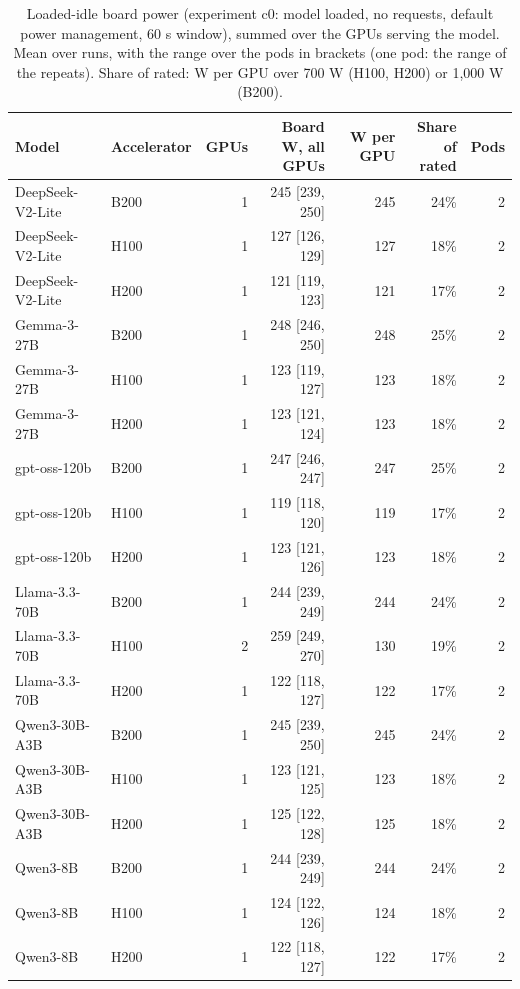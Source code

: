 \begin{table}[t]
\centering
\footnotesize
\setlength{\tabcolsep}{4pt}
\caption{Loaded-idle board power (experiment c0: model loaded, no requests, default power management, 60 s window), summed over the GPUs serving the model. Mean over runs, with the range over the pods in brackets (one pod: the range of the repeats). Share of rated: W per GPU over 700 W (H100, H200) or 1,000 W (B200).}\label{tab:idle}
\begin{tabular}{llrrrrr}
\toprule
Model & Accelerator & GPUs & \makecell[r]{Board W, all\\GPUs} & W per GPU & \makecell[r]{Share of\\rated} & Pods \\
\midrule
DeepSeek-V2-Lite & B200 & 1 & 245 {[}239, 250{]} & 245 & 24\% & 2 \\
DeepSeek-V2-Lite & H100 & 1 & 127 {[}126, 129{]} & 127 & 18\% & 2 \\
DeepSeek-V2-Lite & H200 & 1 & 121 {[}119, 123{]} & 121 & 17\% & 2 \\
Gemma-3-27B & B200 & 1 & 248 {[}246, 250{]} & 248 & 25\% & 2 \\
Gemma-3-27B & H100 & 1 & 123 {[}119, 127{]} & 123 & 18\% & 2 \\
Gemma-3-27B & H200 & 1 & 123 {[}121, 124{]} & 123 & 18\% & 2 \\
gpt-oss-120b & B200 & 1 & 247 {[}246, 247{]} & 247 & 25\% & 2 \\
gpt-oss-120b & H100 & 1 & 119 {[}118, 120{]} & 119 & 17\% & 2 \\
gpt-oss-120b & H200 & 1 & 123 {[}121, 126{]} & 123 & 18\% & 2 \\
Llama-3.3-70B & B200 & 1 & 244 {[}239, 249{]} & 244 & 24\% & 2 \\
Llama-3.3-70B & H100 & 2 & 259 {[}249, 270{]} & 130 & 19\% & 2 \\
Llama-3.3-70B & H200 & 1 & 122 {[}118, 127{]} & 122 & 17\% & 2 \\
Qwen3-30B-A3B & B200 & 1 & 245 {[}239, 250{]} & 245 & 24\% & 2 \\
Qwen3-30B-A3B & H100 & 1 & 123 {[}121, 125{]} & 123 & 18\% & 2 \\
Qwen3-30B-A3B & H200 & 1 & 125 {[}122, 128{]} & 125 & 18\% & 2 \\
Qwen3-8B & B200 & 1 & 244 {[}239, 249{]} & 244 & 24\% & 2 \\
Qwen3-8B & H100 & 1 & 124 {[}122, 126{]} & 124 & 18\% & 2 \\
Qwen3-8B & H200 & 1 & 122 {[}118, 127{]} & 122 & 17\% & 2 \\
\bottomrule
\end{tabular}
\end{table}
